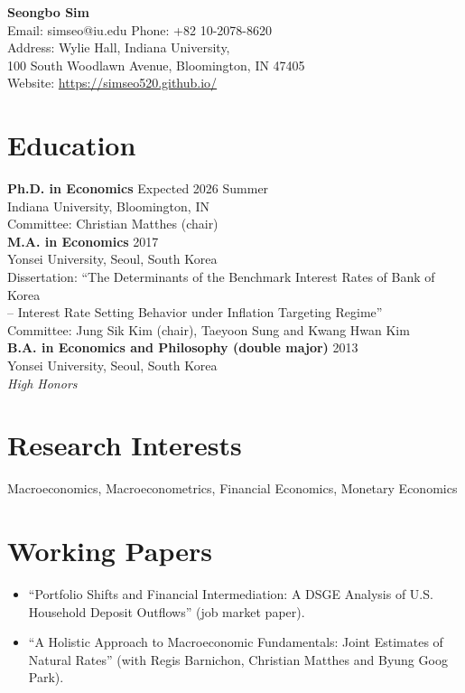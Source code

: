 \documentclass[11pt,a4paper]{article}
\begin{document}
\begin{center}
    {\LARGE \textbf{Seongbo Sim}} \\
    \vspace{2mm}
    Email: simseo@iu.edu \quad Phone: +82 10-2078-8620 \\
    Address: Wylie Hall, Indiana University, \\ 100 South Woodlawn Avenue, Bloomington, IN 47405 \\    
    Website: \hyperlink{https://simseo520.github.io/}{https://simseo520.github.io/}
\end{center}

\vspace{5mm}

\section*{Education}
\textbf{Ph.D. in Economics} \hfill Expected 2026 Summer \\
Indiana University, Bloomington, IN \\
Committee: Christian Matthes (chair)\\%

\textbf{M.A. in Economics} \hfill 2017 \\
Yonsei University, Seoul, South Korea \\
Dissertation: “The Determinants of the Benchmark Interest Rates of Bank of Korea\\
\phantom{Dissertation:} -- Interest Rate
Setting Behavior under Inflation Targeting Regime” \\
Committee: Jung Sik Kim (chair), Taeyoon Sung and Kwang Hwan Kim\\


\textbf{B.A. in Economics and Philosophy (double major)} \hfill 2013 \\
Yonsei University, Seoul, South Korea \\
\emph{High Honors}\\

\section*{Research Interests}
Macroeconomics, Macroeconometrics, Financial Economics, Monetary Economics

\section*{Working Papers} 
\begin{itemize}[leftmargin=*]
    \item ``Portfolio Shifts and Financial Intermediation: A DSGE Analysis of U.S. Household Deposit Outflows'' (job market paper).
    \item ``A Holistic Approach to Macroeconomic
        Fundamentals: Joint Estimates of
        Natural Rates'' (with Regis Barnichon, Christian Matthes and Byung Goog Park).    
\end{itemize}
\end{document}
